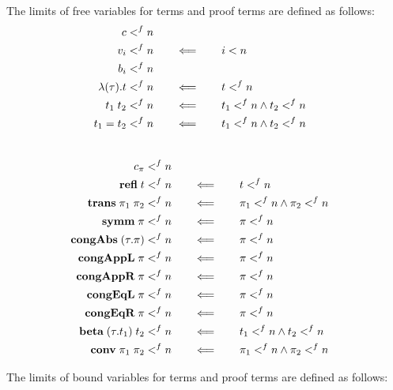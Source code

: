 \documentclass[10pt]{article}
\begin{document}
\begin{mydef}\label{def:stlcd-var-limits}
The limits of free variables for terms and proof terms are defined as follows:\\

\begin{align*}
  c <^{f} n\\
  v_i <^{f} n              & \qquad \Longleftarrow \qquad i < n\\
  b_i <^{f} n\\
  \lambda{(\tau)}.{t} <^{f} n  & \qquad \Longleftarrow \qquad t <^{f} n\\
  t_1\; t_2 <^{f} n      & \qquad \Longleftarrow \qquad t_1 <^{f} n \land t_2 <^{f} n\\
  t_1 = t_2 <^{f} n        & \qquad \Longleftarrow \qquad t_1 <^{f} n \land t_2 <^{f} n
\end{align*}
\\
\begin{align*}
  c_\pi <^{f} n\\
  \mbox{\bf refl}\; t <^{f} n              & \qquad \Longleftarrow \qquad t <^{f} n\\ 
  \mbox{\bf trans}\;\pi_1\; \pi_2 <^{f} n  & \qquad \Longleftarrow \qquad \pi_1 <^{f} n \land \pi_2 <^{f} n\\
  \mbox{\bf symm}\; \pi <^{f} n            & \qquad \Longleftarrow \qquad \pi <^{f} n\\
  \mbox{\bf congAbs}\;(\tau.\pi) <^{f} n & \qquad \Longleftarrow \qquad \pi <^{f} n\\
  \mbox{\bf congAppL}\;\pi <^{f} n        & \qquad \Longleftarrow \qquad \pi <^{f} n\\
  \mbox{\bf congAppR}\;\pi <^{f} n        & \qquad \Longleftarrow \qquad \pi <^{f} n\\
  \mbox{\bf congEqL}\;\pi <^{f} n         & \qquad \Longleftarrow \qquad \pi <^{f} n\\
  \mbox{\bf congEqR}\;\pi <^{f} n         & \qquad \Longleftarrow \qquad \pi <^{f} n\\
  \mbox{\bf beta}\;(\tau.t_1)\; t_2 <^{f} n  & \qquad \Longleftarrow \qquad 
     t_1 <^{f} n \land  t_2 <^{f} n\\
  \mbox{\bf conv}\; \pi_1\; \pi_2 <^{f} n   & \qquad \Longleftarrow \qquad \pi_1 <^{f} n \land  \pi_2 <^{f} n
\end{align*}

The limits of bound variables for terms and proof terms are defined as follows:\\


\end{mydef}
\end{document}
